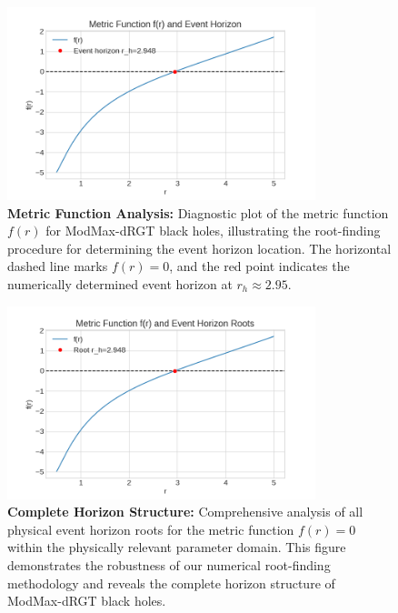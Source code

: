 \documentclass[superscriptaddress, prd, aps,amsmath,amssymb,showpacs,showkeys, onecolumn]{revtex4-2}
\begin{document}
\begin{figure}[H]
    \centering
    \includegraphics[width=0.8\textwidth]{figures/figure_1.png}
    \caption{\textbf{Metric Function Analysis:} Diagnostic plot of the metric function $f(r)$ for ModMax-dRGT black holes, illustrating the root-finding procedure for determining the event horizon location. The horizontal dashed line marks $f(r) = 0$, and the red point indicates the numerically determined event horizon at $r_h \approx 2.95$.}
    \label{fig:notebook_fig1}
\end{figure}

\begin{figure}[H]
    \centering
    \includegraphics[width=0.8\textwidth]{figures/figure_2.png}
    \caption{\textbf{Complete Horizon Structure:} Comprehensive analysis of all physical event horizon roots for the metric function $f(r) = 0$ within the physically relevant parameter domain. This figure demonstrates the robustness of our numerical root-finding methodology and reveals the complete horizon structure of ModMax-dRGT black holes.}
    \label{fig:notebook_fig2}
\end{figure}
\end{document}
